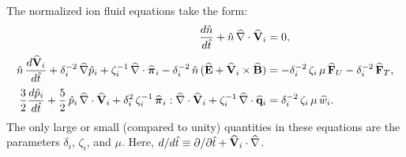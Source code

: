 \documentclass[notitlepage,12pt]{article}
\newcommand{\bpi}{\mbox{\boldmath$\pi$}}
\begin{document}
The normalized ion fluid equations take the form:
\begin{align}\label{e3.116a}
\frac{d\hat{n}}{d\hat{t}} + \hat{n}\,\widehat{\nabla}\cdot\widehat{\bf V}_i &=0,\\[0.5ex]
\hat{n}\,\frac{d\widehat{\bf V}_i}{d\hat{t}} +
\delta_i^{-2}\,\widehat{\nabla}\hat{p}_i+\zeta_i^{-1}\,\widehat{\nabla}
\cdot\widehat{\bpi}_i  
-\delta_i^{-2}\,\hat{n}\,(\widehat{\bf E} + \widehat{\bf V}_i
\times\widehat{\bf B}) &=-\delta_i^{-2}\,\zeta_i\,\mu\,\widehat{\bf F}_U
 - \delta_i^{-2}\,\widehat{\bf F}_T, \\[0.5ex]
\frac{3}{2}\frac{d\hat{p}_i}{d\hat{t}} + \frac{5}{2}\,
\hat{p}_i\,\widehat{\nabla}\cdot\widehat{\bf V}_i + \delta_i^{2}\,
\zeta_i^{-1}\,\widehat{\bpi}_i : \widehat{\nabla}\cdot\widehat{\bf V}_i
+\zeta_i^{-1} \,\widehat{\nabla}\cdot\widehat{\bf q}_{i}
&= \delta_i^{-2}\,\zeta_i\,\mu\,\widehat{w}_i. \label{e3.116c}
\end{align}
The only large or small (compared to unity) quantities in these equations are the
parameters $\delta_i$, $\zeta_i$, and $\mu$. 
Here, $d/d\hat{t}\equiv\partial /\partial\hat{t} +
 \widehat{\bf V}_i\cdot\widehat{\nabla}$.
\end{document}
